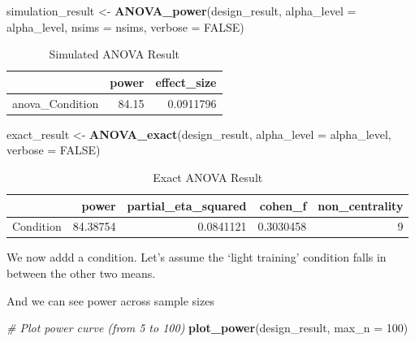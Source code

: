 \documentclass[
]{book}
\newenvironment{Shaded}{\begin{snugshade}}{\end{snugshade}}
\newcommand{\CommentTok}[1]{\textcolor[rgb]{0.56,0.35,0.01}{\textit{#1}}}
\newcommand{\DataTypeTok}[1]{\textcolor[rgb]{0.13,0.29,0.53}{#1}}
\newcommand{\DecValTok}[1]{\textcolor[rgb]{0.00,0.00,0.81}{#1}}
\newcommand{\KeywordTok}[1]{\textcolor[rgb]{0.13,0.29,0.53}{\textbf{#1}}}
\newcommand{\NormalTok}[1]{#1}
\newcommand{\OtherTok}[1]{\textcolor[rgb]{0.56,0.35,0.01}{#1}}
\newcommand{\StringTok}[1]{\textcolor[rgb]{0.31,0.60,0.02}{#1}}
\begin{document}
\begin{Shaded}
\begin{Highlighting}[]
\NormalTok{simulation_result <-}\StringTok{ }\KeywordTok{ANOVA_power}\NormalTok{(design_result, }
                                 \DataTypeTok{alpha_level =}\NormalTok{ alpha_level, }
                                 \DataTypeTok{nsims =}\NormalTok{ nsims,}
                                 \DataTypeTok{verbose =} \OtherTok{FALSE}\NormalTok{)}
\end{Highlighting}
\end{Shaded}

\begin{table}[!h]

\caption{\label{tab:unnamed-chunk-234}Simulated ANOVA Result}
\centering
\begin{tabular}[t]{l|r|r}
\hline
  & power & effect\_size\\
\hline
anova\_Condition & 84.15 & 0.0911796\\
\hline
\end{tabular}
\end{table}

\begin{Shaded}
\begin{Highlighting}[]
\NormalTok{exact_result <-}\StringTok{ }\KeywordTok{ANOVA_exact}\NormalTok{(design_result,}
                            \DataTypeTok{alpha_level =}\NormalTok{ alpha_level,}
                            \DataTypeTok{verbose =} \OtherTok{FALSE}\NormalTok{)}
\end{Highlighting}
\end{Shaded}

\begin{table}[!h]

\caption{\label{tab:unnamed-chunk-236}Exact ANOVA Result}
\centering
\begin{tabular}[t]{l|r|r|r|r}
\hline
  & power & partial\_eta\_squared & cohen\_f & non\_centrality\\
\hline
Condition & 84.38754 & 0.0841121 & 0.3030458 & 9\\
\hline
\end{tabular}
\end{table}

We now addd a condition. Let's assume the `light training' condition falls in between the other two means.

And we can see power across sample sizes

\begin{Shaded}
\begin{Highlighting}[]
\CommentTok{# Plot power curve (from 5 to 100)}
\KeywordTok{plot_power}\NormalTok{(design_result, }\DataTypeTok{max_n =} \DecValTok{100}\NormalTok{)}
\end{Highlighting}
\end{Shaded}
\end{document}
